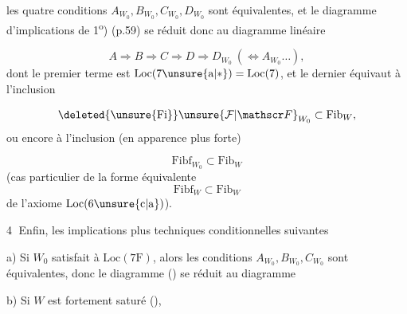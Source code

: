
les quatre conditions $A_{W_0},B_{W_0},C_{W_0},D_{W_0}$ sont équivalentes, et le diagramme d'implications de 1\textsuperscript{o}) (p.59) se réduit donc au diagramme linéaire

\[
 A\Rightarrow B\Longrightarrow C\Longrightarrow D\Longrightarrow D_{W_0}\ (\Leftrightarrow A_{W_0}\ldots),
\]
dont le premier terme  est $\mathrm{Loc}(7\unsure{\mathrm a|*})=\mathrm{Loc}(7)$, et le dernier équivaut à l'inclusion

\[
 \deleted{\unsure{\mathrm{Fi}}}\unsure{\mathcal F|\mathscr F}_{W_0}\subset\mathrm{Fib}_W,
\]
 ou encore à l'inclusion (en apparence plus forte)

\[
 \mathrm{Fibf}_{W_0}\subset\mathrm{Fib}_W
\]
(cas particulier de la forme équivalente
\[
 \mathrm{Fibf}_W\subset\mathrm{Fib}_W
\]
de l'axiome $\mathrm{Loc}(6\unsure{\mathrm c|\mathrm a})$).

\textcircled{4} Enfin,  les implications plus techniques conditionnelles suivantes

a) Si $W_0$ satisfait à $\mathrm{Loc}(7\mathrm F)$, alors les conditions $A_{W_0},B_{W_0},C_{W_0}$ sont équivalentes, donc le diagramme () se réduit au diagramme

b) Si $W$ est fortement saturé (), 
